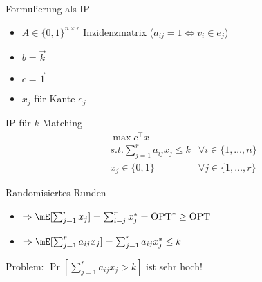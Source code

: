 \documentclass{beamer}
\DeclareMathOperator{\OPT}{OPT}
\newcommand{\set}[1]{\{#1\}}
\begin{document}
\begin{frame}{Formulierung als IP}
  \begin{itemize}
  \item $A\in \set{0,1}^{n\times r}$ Inzidenzmatrix
    ($a_{ij}=1\Leftrightarrow v_{i}\in e_{j}$)
  \item $b=\vec{k}$
  \item $c=\vec{1}$
  \item $x_{j}$ für Kante $e_{j}$
  \end{itemize}
  \pause
  \begin{block}{IP für $k$-Matching}
    \begin{align*}
      &\max c^{\top}x\\
      &s.t. \sum_{j=1}^{r}a_{ij}x_{j}\leq k&\forall i\in \set{1,\ldots,n}\\
      &x_{j}\in \set{0,1}&\forall j\in \set{1,\ldots,r}
    \end{align*}
  \end{block}
  
\end{frame}
\begin{frame}{Randomisiertes Runden}
  \begin{itemize}
  \item $\Rightarrow
    \mE[\sum_{j=1}^{r}x_{j}]=\sum_{i=j}^{r}x^{*}_{j}=\OPT^{*}\geq \OPT$
  \item $\Rightarrow
    \mE[\sum_{j=1}^{r}a_{ij}x_{j}]=\sum_{j=1}^{r}a_{ij}x^{*}_{j}\leq k$
  \end{itemize}\pause
  Problem: $\Pr[\sum_{j=1}^{r}a_{ij}x_{j}>k]$ ist sehr hoch!
\end{frame}
\end{document}
